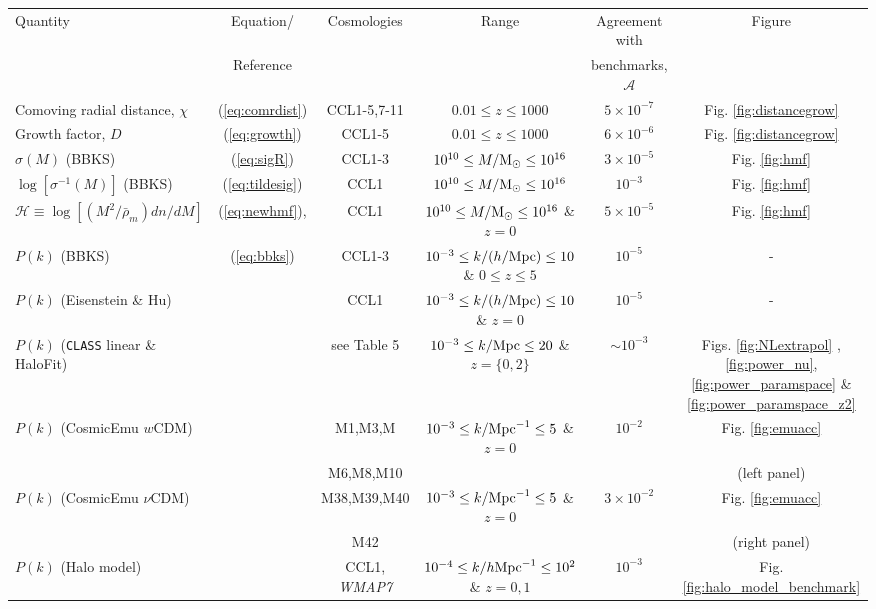 
%
\begin{sidewaystable*}[!htp]
  \vskip 4cm
  \centering
  \begin{tabular}{ l|c c c c c}
    \hline
    Quantity & Equation/ & Cosmologies & Range & Agreement with & Figure \\
    & Reference &  & & benchmarks, $\mathcal{A}$ & \\
    \hline
    Comoving radial distance, $\chi$ & (\ref{eq:comrdist}) & CCL1-5,7-11 & $0.01 \leq z\leq 1000$ &  $5\times 10^{-7}$ & Fig. \ref{fig:distancegrow}\\
    Growth factor, $D$ & (\ref{eq:growth}) & CCL1-5 &  $0.01 \leq z\leq 1000 $ &  $6\times 10^{-6}$ & Fig. \ref{fig:distancegrow}\\
    $\sigma(M)$ (BBKS) & (\ref{eq:sigR}) & CCL1-3 &  $10^{10}\leq M/{\rm M}_\odot\leq 10^{16}$ &  $3\times 10^{-5}$ & Fig. \ref{fig:hmf}\\
    $\log[\sigma^{-1}(M)]$ (BBKS) & (\ref{eq:tildesig}) & CCL1 &  $10^{10}\leq M/{\rm M}_\odot\leq 10^{16}$ &  $10^{-3}$ & Fig. \ref{fig:hmf}\\
    $\mathcal H \equiv \log[(M^2/\bar{\rho}_m)dn/dM]$  & (\ref{eq:newhmf}), \citet{Tinker2010} & CCL1 & $10^{10}\leq M/{\rm M}_\odot\leq 10^{16}$ \& $z=0$ & $5\times 10^{-5}$ & Fig. \ref{fig:hmf}\\
    $P(k)$ (BBKS) & (\ref{eq:bbks}) & CCL1-3 & $10^{-3}\leq k/(h/{\rm Mpc})\leq 10$ \& $0\leq z\leq 5$ &  $10^{-5}$ & -\\
    $P(k)$ (Eisenstein \& Hu) & \citet{1998ApJ...496..605E}  & CCL1 & $10^{-3}\leq k/(h/{\rm Mpc})\leq 10$ \& $z=0$ & $10^{-5}$ & -\\
    $P(k)$ ({\tt CLASS} linear \& HaloFit) & \citet{CLASS_halofit}  & see Table 5 & $10^{-3}\leq k/{\rm Mpc}\leq 20$ \& $z=\{0,2\}$  &$\sim 10^{-3}$ & Figs. \ref{fig:NLextrapol} , \ref{fig:power_nu}, \ref{fig:power_paramspace} \& \ref{fig:power_paramspace_z2} \\
    $P(k)$ (CosmicEmu $w$CDM) & \citet{Lawrence17} & M1,M3,M & $10^{-3}\leq k/{\rm Mpc}^{-1}\leq 5$ \& $z=0$  & $10^{-2}$ & Fig. \ref{fig:emuacc} \\
    & & M6,M8,M10 & & & (left panel)\\
    $P(k)$ (CosmicEmu $\nu$CDM) & \citet{Lawrence17} & M38,M39,M40 & $10^{-3}\leq k/{\rm Mpc}^{-1}\leq 5$ \& $z=0$ & $3\times 10^{-2}$ & Fig. \ref{fig:emuacc} \\
    &  & M42 &  &  & (right panel)\\
    $P(k)$ (Halo model) & \citet{Cooray2002} & CCL1, {\it WMAP7} & $10^{-4}\leq k/h{\rm Mpc}^{-1}\leq 10^{2}$ \& $z=0,1$ & $10^{-3}$ & Fig. \ref{fig:halo_model_benchmark}\\

\end{tabular}
\end{sidewaystable*}
